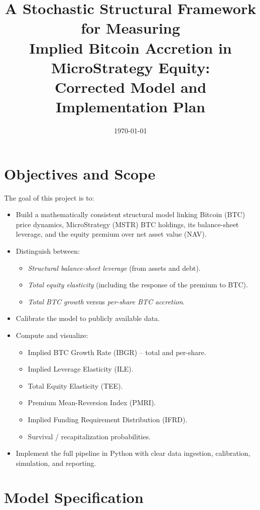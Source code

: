 \documentclass[11pt]{article}
\title{A Stochastic Structural Framework for Measuring\\
Implied Bitcoin Accretion in MicroStrategy Equity:\\
Corrected Model and Implementation Plan}
\author{}
\date{\today}
\begin{document}
\maketitle

\section{Objectives and Scope}

The goal of this project is to:
\begin{itemize}
  \item Build a mathematically consistent structural model linking Bitcoin (BTC) price dynamics, MicroStrategy (MSTR) BTC holdings, its balance-sheet leverage, and the equity premium over net asset value (NAV).
  \item Distinguish between:
  \begin{itemize}
    \item \emph{Structural balance-sheet leverage} (from assets and debt).
    \item \emph{Total equity elasticity} (including the response of the premium to BTC).
    \item \emph{Total BTC growth} versus \emph{per-share BTC accretion}.
  \end{itemize}
  \item Calibrate the model to publicly available data.
  \item Compute and visualize:
    \begin{itemize}
      \item Implied BTC Growth Rate (IBGR) -- total and per-share.
      \item Implied Leverage Elasticity (ILE).
      \item Total Equity Elasticity (TEE).
      \item Premium Mean-Reversion Index (PMRI).
      \item Implied Funding Requirement Distribution (IFRD).
      \item Survival / recapitalization probabilities.
    \end{itemize}
  \item Implement the full pipeline in Python with clear data ingestion, calibration, simulation, and reporting.
\end{itemize}

\section{Model Specification}
\end{document}
